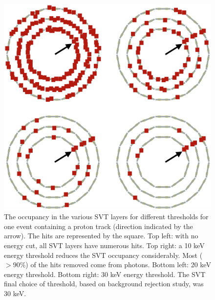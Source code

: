\begin{figure}
	\centering
	\includegraphics[width=0.99\columnwidth,keepaspectratio]{img/bstHitDisplay.png}
	\caption{The occupancy in the various SVT layers for different thresholds for one event containing a proton
             track (direction indicated by the arrow). The hits are represented by the square.
             Top left: with no energy cut, all SVT layers have numerous hits. Top right: a 10 keV energy threshold
             reduces the SVT occupancy considerably. Most ($>90\%$) of the hits removed come from photons.
             Bottom left: 20 keV energy threshold. Bottom right: 30 keV energy threshold.
             The SVT final choice of threshold, based on background rejection study, was 30 keV. }
	\label{fig:radStudyThreshold}
\end{figure}




